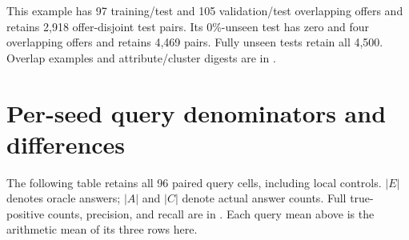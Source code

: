\documentclass[11pt,letterpaper]{article}
\begin{document}
This example has 97 training/test and 105 validation/test overlapping offers and retains 2,918 offer-disjoint test pairs. Its 0\%-unseen test has zero and four overlapping offers and retains 4,469 pairs. Fully unseen tests retain all 4,500. Overlap examples and attribute/cluster digests are in .

\section{Per-seed query denominators and differences}
The following table retains all 96 paired query cells, including local controls. $|E|$ denotes oracle answers; $|A|$ and $|C|$ denote actual answer counts. Full true-positive counts, precision, and recall are in . Each query mean above is the arithmetic mean of its three rows here.
\end{document}
